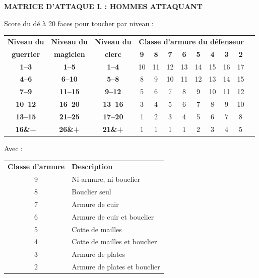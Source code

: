 \bigskip

\textbf{MATRICE D'ATTAQUE I. : HOMMES ATTAQUANT}

\bigskip

Score du dé à 20 faces pour toucher par niveau :

\bigskip

\begin{tabular}{cccccccccccc}
\textbf{Niveau du } & \textbf{Niveau du } & \textbf{Niveau du } & \multicolumn{8}{c}{\textbf{Classe d'armure du défenseur}} \\
\textbf{guerrier}   & \textbf{magicien}   & \textbf{clerc}   & \textbf{9} & \textbf{8} & \textbf{7} & \textbf{6} & \textbf{5} & \textbf{4} & \textbf{3} & \textbf{2} \\
\textbf{1--3}   & \textbf{1--5}   & \textbf{1--4}   & 10 & 11 & 12 & 13 & 14 & 15 & 16 & 17 \\
\textbf{4--6}   & \textbf{6--10}  & \textbf{5--8}   &  8 &  9 & 10 & 11 & 12 & 13 & 14 & 15 \\
\textbf{7--9}   & \textbf{11--15} & \textbf{9--12}  &  5 &  6 &  7 &  8 &  9 & 10 & 11 & 12 \\
\textbf{10--12} & \textbf{16--20} & \textbf{13--16} &  3 &  4 &  5 &  6 &  7 &  8 &  9 & 10 \\
\textbf{13--15} & \textbf{21--25} & \textbf{17--20} &  1 &  2 &  3 &  4 &  5 &  6 &  7 &  8 \\
\textbf{16\&+}  & \textbf{26\&+}  & \textbf{21\&+}  &  1 &  1 &  1 &  1 &  2 &  3 &  4 &  5 \\
\end{tabular}

\bigskip

Avec :

\bigskip

\begin{tabular}{cl}
\textbf{Classe d'armure} & \textbf{Description} \\
9 & Ni armure, ni bouclier \\
8 & Bouclier seul \\
7 & Armure de cuir \\
6 & Armure de cuir et bouclier \\
5 & Cotte de mailles \\
4 & Cotte de mailles et bouclier \\
3 & Armure de plates \\
2 & Armure de plates et bouclier \\
\end{tabular}

